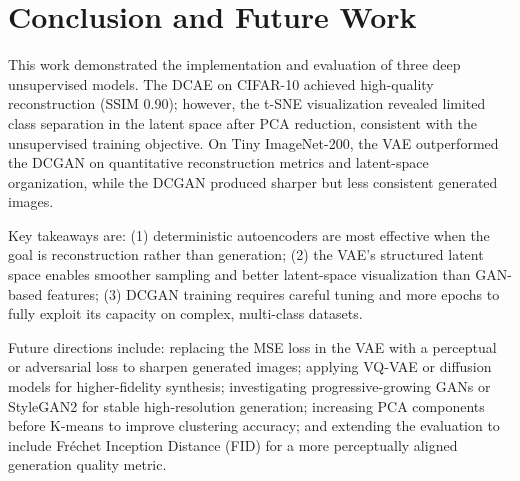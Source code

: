 \documentclass[12pt]{article}
\begin{document}
\section{Conclusion and Future Work}

This work demonstrated the implementation and evaluation of three deep unsupervised models. The DCAE on CIFAR-10 achieved high-quality reconstruction (SSIM 0.90); however, the t-SNE visualization revealed limited class separation in the latent space after PCA reduction, consistent with the unsupervised training objective. On Tiny ImageNet-200, the VAE outperformed the DCGAN on quantitative reconstruction metrics and latent-space organization, while the DCGAN produced sharper but less consistent generated images.

Key takeaways are: (1) deterministic autoencoders are most effective when the goal is reconstruction rather than generation; (2) the VAE's structured latent space enables smoother sampling and better latent-space visualization than GAN-based features; (3) DCGAN training requires careful tuning and more epochs to fully exploit its capacity on complex, multi-class datasets.

Future directions include: replacing the MSE loss in the VAE with a perceptual or adversarial loss to sharpen generated images; applying VQ-VAE or diffusion models for higher-fidelity synthesis; investigating progressive-growing GANs or StyleGAN2 for stable high-resolution generation; increasing PCA components before K-means to improve clustering accuracy; and extending the evaluation to include Fréchet Inception Distance (FID) for a more perceptually aligned generation quality metric.
\end{document}
